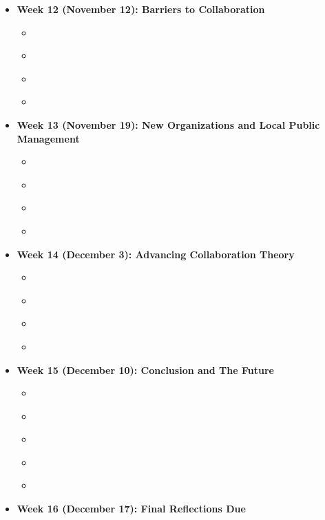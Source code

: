 \documentclass[12pt, letterpaper]{article}
\begin{document}
\begin{itemize}
	\item[] \textbf{Week 12 (November 12): Barriers to Collaboration}
		\begin{itemize}
			\item \citet[chap.~7]{Agranoff2012}
			\item \citet[chap.~8]{Henderson2015}
			\item  \citet[chaps.~3–4]{OLeary2009}
			\item  \citet{OToole2004}
		\end{itemize}
	
	\item[] \textbf{Week 13 (November 19): New Organizations and Local Public Management}
		\begin{itemize}
			\item \citet[chap.~8]{Agranoff2012}
			\item \citet[chaps.~7,~9]{Henderson2015}
			\item  \citet[chaps.~5–6]{OLeary2009}
			\item  \citet{Williams2016}
		\end{itemize}

	
	\item[] \textbf{Week 14 (December 3): Advancing Collaboration Theory}
		\begin{itemize}
			\item \citet{Williams2016a}
			\item  \citet{Dietz2003}
			\item  \citet{Lubell2007}
			\item  \citet{Lubell2010}

		\end{itemize}
	
	\item[] \textbf{Week 15 (December 10): Conclusion and The Future}
		\begin{itemize}
			\item \citet[chap.~9]{Agranoff2012}
			\item \citet[chap.~10]{Henderson2015}
			\item  \citet[chap.~9]{Agranoff2017}
			\item  \citet[chap.~14]{Bingham2008}
			\item  \cite[chap.~10]{Kickert1997}
		\end{itemize}
	
	\item[] \textbf{Week 16 (December 17): Final Reflections Due}
	
\end{itemize}
\end{document}
